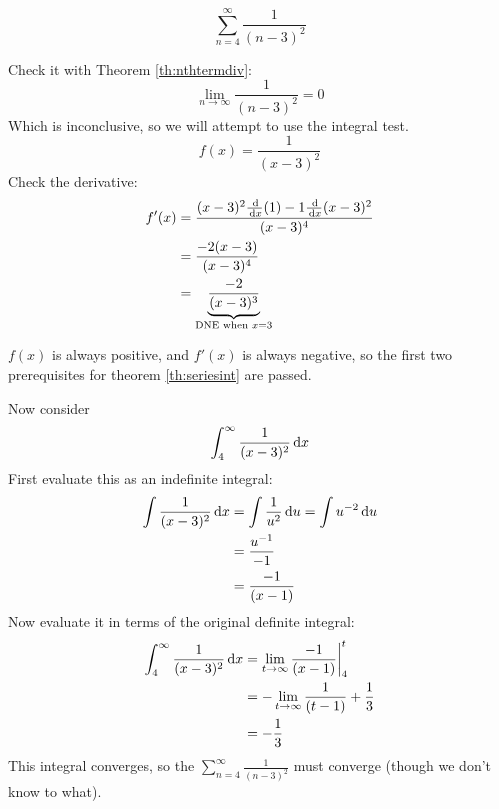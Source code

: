 \begin{ex}
  \[ \sum^\infty_{n=4} \frac{1}{(n-3)^2} \]
  \begin{sol}
    Check it with Theorem \ref{th:nthtermdiv}:
    \[ \lim_{n \to \infty} \frac{1}{(n-3)^2} = 0 \]
    Which is inconclusive, so we will attempt to use the integral test.
    \[ f(x) = \frac{1}{(x-3)^2} \]
    Check the derivative:
    \begin{align*}
      f'(x) &= \frac{(x-3)^2 \frac{\,\mathrm{d}}{\,\mathrm{d} x}(1) - 1 \frac{\,\mathrm{d}}{\,\mathrm{d} x}(x-3)^2} {(x-3)^4} \\
        &= \frac{-2(x-3)}{(x-3)^4} \\
        &= \underbrace{\frac{-2}{(x-3)^3}}_{\text{DNE when } x=3 }
    \end{align*}
    \begin{table}[h]
      \centering
      \caption{A sign diagram of $f(x)$ and $f'(x)$}
    \end{table}
    $f(x)$ is always positive, and $f'(x)$ is always negative, so the first two prerequisites for theorem \ref{th:seriesint} are passed.

    Now consider
      \[ \int^\infty_4 \frac{1}{(x-3)^2} \,\mathrm{d} x  \]
    {First evaluate this as an indefinite integral:}
    \begin{align*}
      \int \frac{1}{(x-3)^2}\,\mathrm{d} x
      &=\int \frac{1}{u^2}\,\mathrm{d} u =\int u^{-2} \,\mathrm{d} u \\
      &=\frac{u^{-1}}{-1} \\
      &=\frac{-1}{(x-1)}
    \end{align*}
      {Now evaluate it in terms of the original definite integral:}
    \begin{align*}
      \int^\infty_4 \frac{1}{(x-3)^2} \,\mathrm{d} x
      &=\lim_{t\to\infty} \frac{-1}{(x-1)}\bigg|^t_4 \\
      &=-\lim_{t\to\infty} \frac{1}{(t-1)}+\frac{1}{3} \\
      &=-\frac{1}{3}
    \end{align*}
    This integral converges, so the $\sum^\infty_{n=4}
    \frac{1}{(n-3)^2}$ must converge (though we don't know to what).
  \end{sol}
\end{ex}
